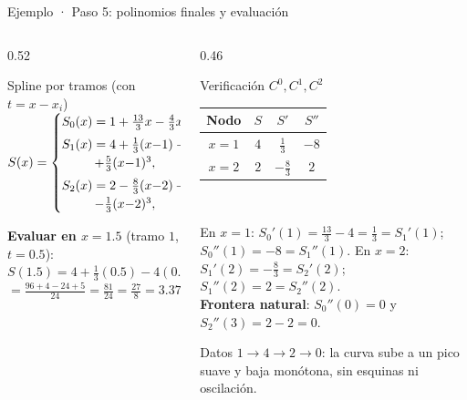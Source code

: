 \documentclass[aspectratio=169,10pt]{beamer}
\begin{document}
\begin{frame}{Ejemplo · Paso 5: polinomios finales y evaluación}
\begin{columns}[T]
\begin{column}{0.52\textwidth}
\begin{cardidea}{Spline por tramos (con $t=x-x_i$)}{\faSuperscript}
{\footnotesize $S(x)=\begin{cases}
S_0(x)=1+\tfrac{13}{3}x-\tfrac43x^3, & x\in[0,1]\\[1.2mm]
S_1(x)=4+\tfrac13(x{-}1)-4(x{-}1)^2 & \\
\hspace{9mm}+\tfrac53(x{-}1)^3, & x\in[1,2]\\[1.2mm]
S_2(x)=2-\tfrac83(x{-}2)+(x{-}2)^2 & \\
\hspace{9mm}-\tfrac13(x{-}2)^3, & x\in[2,3]
\end{cases}$}
\end{cardidea}
\vspace{1mm}
\begin{cardnota}[\faCalculator]
{\footnotesize \textbf{Evaluar en $x=1.5$} (tramo $1$, $t=0.5$):\\[0.4mm]
$S(1.5)=4+\tfrac13(0.5)-4(0.25)+\tfrac53(0.125)$\\[0.2mm]
$=\tfrac{96+4-24+5}{24}=\tfrac{81}{24}=\tfrac{27}{8}=3.375.$}
\end{cardnota}
\end{column}
\begin{column}{0.46\textwidth}
\begin{cardgear}{Verificación $C^0,C^1,C^2$}{\faTable}
\centering
{\footnotesize\renewcommand{\arraystretch}{1.3}\setlength{\tabcolsep}{5pt}
\begin{tabular}{c|ccc}
Nodo & $S$ & $S'$ & $S''$\\\hline
$x=1$ & $4$ & $\tfrac13$ & $-8$\\
$x=2$ & $2$ & $-\tfrac83$ & $2$\\
\end{tabular}}\\[1.2mm]
\raggedright
{\footnotesize En $x=1$: $S_0'(1)=\tfrac{13}{3}-4=\tfrac13=S_1'(1)$; $S_0''(1)=-8=S_1''(1)$. En $x=2$: $S_1'(2)=-\tfrac83=S_2'(2)$; $S_1''(2)=2=S_2''(2)$. \checkmark\\[0.8mm]
\textbf{Frontera natural}: $S_0''(0)=0$ y $S_2''(3)=2-2=0$. \checkmark}
\end{cardgear}
\vspace{1mm}
\begin{cardnota}[\faInfoCircle]
{\footnotesize Datos $1\!\to\!4\!\to\!2\!\to\!0$: la curva sube a un pico suave y baja monótona, sin esquinas ni oscilación.}
\end{cardnota}
\end{column}
\end{columns}
\end{frame}
\end{document}
